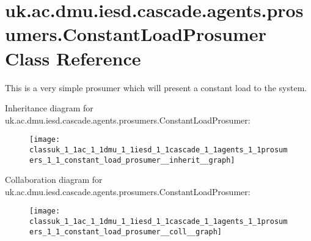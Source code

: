 \hypertarget{classuk_1_1ac_1_1dmu_1_1iesd_1_1cascade_1_1agents_1_1prosumers_1_1_constant_load_prosumer}{\section{uk.\-ac.\-dmu.\-iesd.\-cascade.\-agents.\-prosumers.\-Constant\-Load\-Prosumer Class Reference}
\label{classuk_1_1ac_1_1dmu_1_1iesd_1_1cascade_1_1agents_1_1prosumers_1_1_constant_load_prosumer}
}


This is a very simple prosumer which will present a constant load to the system.  




Inheritance diagram for uk.\-ac.\-dmu.\-iesd.\-cascade.\-agents.\-prosumers.\-Constant\-Load\-Prosumer\-:\nopagebreak
\begin{figure}[H]
\begin{center}
\leavevmode
\texttt{[image: classuk\_1\_1ac\_1\_1dmu\_1\_1iesd\_1\_1cascade\_1\_1agents\_1\_1prosumers\_1\_1\_constant\_load\_prosumer\_\_inherit\_\_graph]}
\end{center}
\end{figure}


Collaboration diagram for uk.\-ac.\-dmu.\-iesd.\-cascade.\-agents.\-prosumers.\-Constant\-Load\-Prosumer\-:\nopagebreak
\begin{figure}[H]
\begin{center}
\leavevmode
\texttt{[image: classuk\_1\_1ac\_1\_1dmu\_1\_1iesd\_1\_1cascade\_1\_1agents\_1\_1prosumers\_1\_1\_constant\_load\_prosumer\_\_coll\_\_graph]}
\end{center}
\end{figure}
